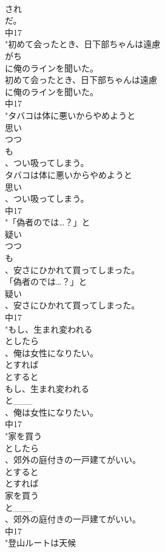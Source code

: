 \documentclass[8pt]{extreport}
\begin{document}
\begin{CJK}{UTF8}{min}
\\	され
\\	だ。
\\	中17
\\	"初めて会ったとき、日下部ちゃんは遠慮
\\	がち
\\	に俺のラインを聞いた。
\\	初めて会ったとき、日下部ちゃんは遠慮
\\	に俺のラインを聞いた。
\\	中17
\\	"タバコは体に悪いからやめようと
\\	思い
\\	つつ
\\	も
\\	、つい吸ってしまう。
\\	タバコは体に悪いからやめようと
\\	思い
\\	、つい吸ってしまう。
\\	中17
\\	"「偽者のでは…？」と
\\	疑い
\\	つつ
\\	も
\\	、安さにひかれて買ってしまった。
\\	「偽者のでは…？」と
\\	疑い
\\	、安さにひかれて買ってしまった。
\\	中17
\\	"もし、生まれ変われる
\\	としたら
\\	、俺は女性になりたい。
\\	とすれば
\\	とすると
\\	もし、生まれ変われる
\\	と___
\\	、俺は女性になりたい。
\\	中17
\\	"家を買う
\\	としたら
\\	、郊外の庭付きの一戸建てがいい。
\\	とすると
\\	とすれば
\\	家を買う
\\	と___
\\	、郊外の庭付きの一戸建てがいい。
\\	中17
\\	"登山ルートは天候

\end{CJK}
\end{document}
